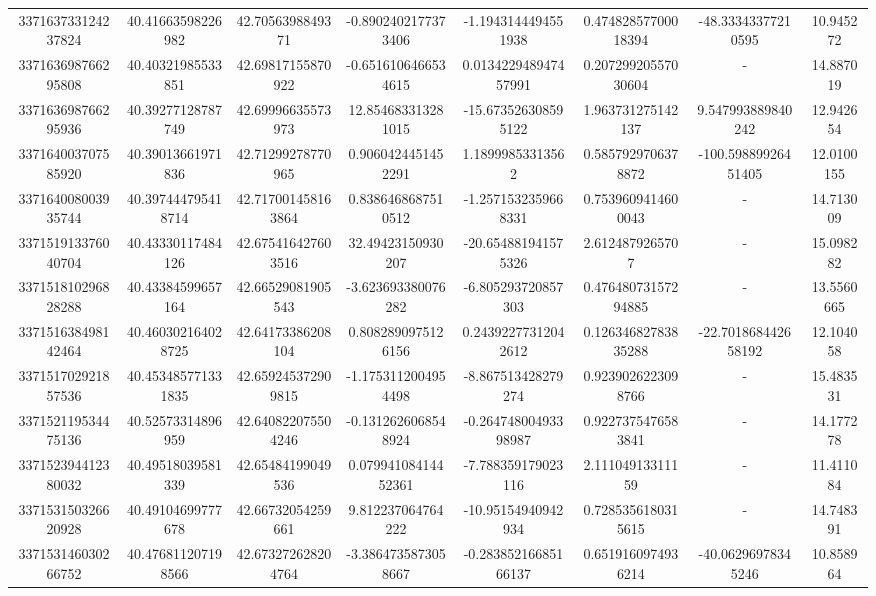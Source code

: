 \documentclass{article}
\begin{document}
\begin{landscape}
\begin{longtable}[c]{S[table-format=18.0]S[table-format=2.15]S[table-format=2.15]S[table-format=-2.17]S[table-format=-2.16]S[table-format=-2.16]S[table-format=-3.16]S[table-format=2.7]}
337163733124237824 & 40.41663598226982  & 42.7056398849371   & -0.8902402177373406   & -1.1943144494551938  & 0.47482857700018394  & -48.33343377210595  & 10.945272  \\
337163698766295808 & 40.40321985533851  & 42.69817155870922  & -0.6516106466534615   & 0.013422948947457991 & 0.20729920557030604  & {-}                  & 14.887019  \\
337163698766295936 & 40.39277128787749  & 42.69996635573973  & 12.854683313281015    & -15.673526308595122  & 1.963731275142137    & 9.547993889840242   & 12.942654  \\
337164003707585920 & 40.39013661971836  & 42.71299278770965  & 0.9060424451452291    & 1.18999853313562     & 0.5857929706378872   & -100.59889926451405 & 12.0100155 \\
337164008003935744 & 40.397444795418714 & 42.717001458163864 & 0.8386468687510512    & -1.2571532359668331  & 0.7539609414600043   & {-}                  & 14.713009  \\
337151913376040704 & 40.43330117484126  & 42.675416427603516 & 32.49423150930207     & -20.654881941575326  & 2.6124879265707      & {-}                  & 15.098282  \\
337151810296828288 & 40.43384599657164  & 42.66529081905543  & -3.623693380076282    & -6.805293720857303   & 0.47648073157294885  & {-}                  & 13.5560665 \\
337151638498142464 & 40.460302164028725 & 42.64173386208104  & 0.8082890975126156    & 0.24392277312042612  & 0.12634682783835288  & -22.701868442658192 & 12.104058  \\
337151702921857536 & 40.453485771331835 & 42.659245372909815 & -1.1753112004954498   & -8.867513428279274   & 0.9239026223098766   & {-}                  & 15.483531  \\
337152119534475136 & 40.52573314896959  & 42.640822075504246 & -0.1312626068548924   & -0.26474800493398987 & 0.9227375476583841   & {-}                  & 14.177278  \\
337152394412380032 & 40.49518039581339  & 42.65484199049536  & 0.07994108414452361   & -7.788359179023116   & 2.11104913311159     & {-}                  & 11.411084  \\
337153150326620928 & 40.49104699777678  & 42.66732054259661  & 9.812237064764222     & -10.95154940942934   & 0.7285356180315615   & {-}                  & 14.748391  \\
337153146030266752 & 40.476811207198566 & 42.673272628204764 & -3.3864735873058667   & -0.28385216685166137 & 0.6519160974936214   & -40.06296978345246  & 10.858964  \\

\end{longtable}
\end{landscape}
\end{document}
